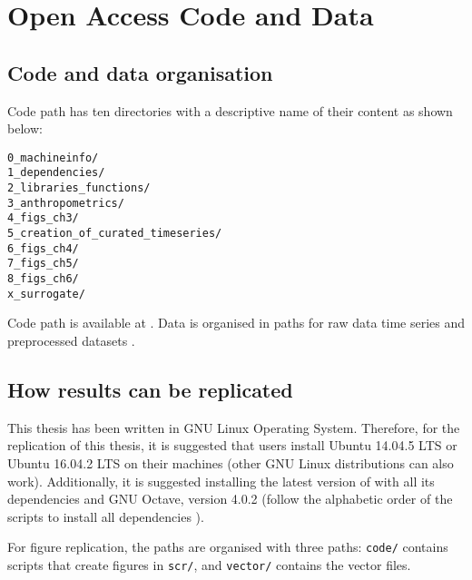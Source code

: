 \chapter{Open Access Code and Data} \label{appendix:a}

\section{Code and data organisation} 
Code path has ten directories with a descriptive name of their content
as shown below: 
\begin{verbatim}
0_machineinfo/
1_dependencies/  
2_libraries_functions/  
3_anthropometrics/      
4_figs_ch3/                        
5_creation_of_curated_timeseries/  
6_figs_ch4/  
7_figs_ch5/  
8_figs_ch6/
x_surrogate/
\end{verbatim}
Code path is available at .
Data is organised in paths for raw data time series and 
preprocessed datasets .

\section{How results can be replicated} 
This thesis has been written in GNU Linux Operating System.
Therefore, for the replication of this thesis, 
it is suggested that users install 
Ubuntu 14.04.5 LTS or Ubuntu 16.04.2 LTS on their machines 
(other GNU Linux distributions can also work).
Additionally, it is suggested installing the latest version of \R 
with all its dependencies and GNU Octave, version 4.0.2
(follow the alphabetic order of the scripts
to install all dependencies 
).

For figure replication, the paths are organised with three 
paths: \texttt{code/} contains \R scripts that create figures in \texttt{scr/}, 
and \texttt{vector/} contains the vector files.


